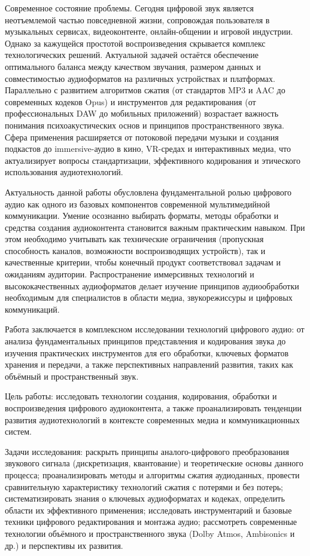\documentclass{SibFU-docs}
\begin{document}
Современное состояние проблемы. Сегодня цифровой звук является неотъемлемой частью повседневной жизни, сопровождая пользователя в музыкальных сервисах, видеоконтенте, онлайн-общении и игровой индустрии. Однако за кажущейся простотой воспроизведения скрывается комплекс технологических решений. Актуальной задачей остаётся обеспечение оптимального баланса между качеством звучания, размером данных и совместимостью аудиоформатов на различных устройствах и платформах. Параллельно с развитием алгоритмов сжатия (от стандартов MP3 и AAC до современных кодеков Opus) и инструментов для редактирования (от профессиональных DAW до мобильных приложений) возрастает важность понимания психоакустических основ и принципов пространственного звука. Сфера применения расширяется от потоковой передачи музыки и создания подкастов до immersive-аудио в кино, VR-средах и интерактивных медиа, что актуализирует вопросы стандартизации, эффективного кодирования и этического использования аудиотехнологий.

Актуальность данной работы обусловлена фундаментальной ролью цифрового аудио как одного из базовых компонентов современной мультимедийной коммуникации. Умение осознанно выбирать форматы, методы обработки и средства создания аудиоконтента становится важным практическим навыком. При этом необходимо учитывать как технические ограничения (пропускная способность каналов, возможности воспроизводящих устройств), так и качественные критерии, чтобы конечный продукт соответствовал задачам и ожиданиям аудитории. Распространение иммерсивных технологий и высококачественных аудиоформатов делает изучение принципов аудиообработки необходимым для специалистов в области медиа, звукорежиссуры и цифровых коммуникаций.

Работа заключается в комплексном исследовании технологий цифрового аудио: от анализа фундаментальных принципов представления и кодирования звука до изучения практических инструментов для его обработки, ключевых форматов хранения и передачи, а также перспективных направлений развития, таких как объёмный и пространственный звук.

Цель работы: исследовать технологии создания, кодирования, обработки и воспроизведения цифрового аудиоконтента, а также проанализировать тенденции развития аудиотехнологий в контексте современных медиа и коммуникационных систем.

Задачи исследования: раскрыть принципы аналого-цифрового преобразования звукового сигнала (дискретизация, квантование) и теоретические основы данного процесса; проанализировать методы и алгоритмы сжатия аудиоданных, провести сравнительную характеристику технологий сжатия с потерями и без потерь; систематизировать знания о ключевых аудиоформатах и кодеках, определить области их эффективного применения; исследовать инструментарий и базовые техники цифрового редактирования и монтажа аудио; рассмотреть современные технологии объёмного и пространственного звука (Dolby Atmos, Ambisonics и др.) и перспективы их развития.
\end{document}
